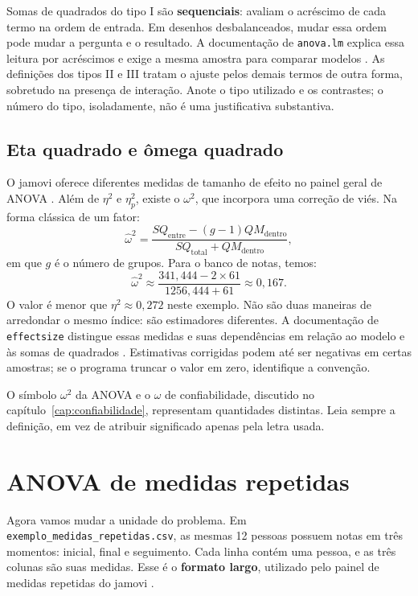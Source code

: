 Somas de quadrados do tipo I são \textbf{sequenciais}: avaliam o acréscimo de cada termo na ordem de entrada. Em desenhos desbalanceados, mudar essa ordem pode mudar a pergunta e o resultado. A documentação de \texttt{anova.lm} explica essa leitura por acréscimos e exige a mesma amostra para comparar modelos \parencite{RAnovaModelos}. As definições dos tipos II e III tratam o ajuste pelos demais termos de outra forma, sobretudo na presença de interação. Anote o tipo utilizado e os contrastes; o número do tipo, isoladamente, não é uma justificativa substantiva.

\subsection{Eta quadrado e ômega quadrado}

O jamovi oferece diferentes medidas de tamanho de efeito no painel geral de ANOVA \parencite{JamoviAnovaFatorial}. Além de $\eta^2$ e $\eta_p^2$, existe o $\omega^2$, que incorpora uma correção de viés. Na forma clássica de um fator:
\[
\widehat\omega^2=
\frac{SQ_{\mathrm{entre}}-(g-1)QM_{\mathrm{dentro}}}
{SQ_{\mathrm{total}}+QM_{\mathrm{dentro}}},
\]
em que $g$ é o número de grupos. Para o banco de notas, temos:
\[
\widehat\omega^2\approx
\frac{341{,}444-2\times61}{1256{,}444+61}
\approx0{,}167.
\]
O valor é menor que $\eta^2\approx0{,}272$ neste exemplo. Não são duas maneiras de arredondar o mesmo índice: são estimadores diferentes. A documentação de \texttt{effectsize} distingue essas medidas e suas dependências em relação ao modelo e às somas de quadrados \parencite{EffectsizeAnova}. Estimativas corrigidas podem até ser negativas em certas amostras; se o programa truncar o valor em zero, identifique a convenção.

O símbolo $\omega^2$ da ANOVA e o $\omega$ de confiabilidade, discutido no capítulo~\ref{cap:confiabilidade}, representam quantidades distintas. Leia sempre a definição, em vez de atribuir significado apenas pela letra usada.

\section{ANOVA de medidas repetidas}
\label{sec:anova-repetidas}

Agora vamos mudar a unidade do problema. Em \texttt{exemplo\_medidas\_repetidas.csv}, as mesmas 12 pessoas possuem notas em três momentos: inicial, final e seguimento. Cada linha contém uma pessoa, e as três colunas são suas medidas. Esse é o \textbf{formato largo}, utilizado pelo painel de medidas repetidas do jamovi \parencite{JamoviAnovaRM}.

